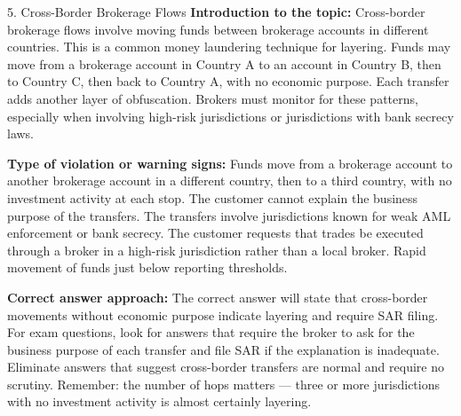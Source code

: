 \documentclass[11pt,a4paper]{beamer}
\begin{document}
\begin{frame}{5. Cross-Border Brokerage Flows}
\tiny
\noindent\textbf{Introduction to the topic:} Cross-border brokerage flows involve moving funds between brokerage accounts in different countries. This is a common money laundering technique for layering. Funds may move from a brokerage account in Country A to an account in Country B, then to Country C, then back to Country A, with no economic purpose. Each transfer adds another layer of obfuscation. Brokers must monitor for these patterns, especially when involving high-risk jurisdictions or jurisdictions with bank secrecy laws.

\vspace{0.1cm}
\noindent\textbf{Type of violation or warning signs:} Funds move from a brokerage account to another brokerage account in a different country, then to a third country, with no investment activity at each stop. The customer cannot explain the business purpose of the transfers. The transfers involve jurisdictions known for weak AML enforcement or bank secrecy. The customer requests that trades be executed through a broker in a high-risk jurisdiction rather than a local broker. Rapid movement of funds just below reporting thresholds.

\vspace{0.1cm}
\noindent\textbf{Correct answer approach:} The correct answer will state that cross-border movements without economic purpose indicate layering and require SAR filing. For exam questions, look for answers that require the broker to ask for the business purpose of each transfer and file SAR if the explanation is inadequate. Eliminate answers that suggest cross-border transfers are normal and require no scrutiny. Remember: the number of hops matters — three or more jurisdictions with no investment activity is almost certainly layering.
\end{frame}
\end{document}
